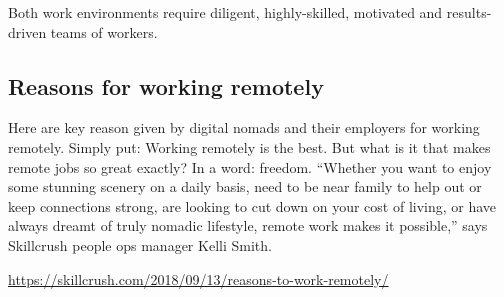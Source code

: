 \documentclass[]{book}
\begin{document}
Both work environments require diligent, highly-skilled, motivated and results-driven teams of workers.

\hypertarget{reasons-for-working-remotely}{%
\subsection{Reasons for working remotely}\label{reasons-for-working-remotely}}

Here are key reason given by digital nomads and their employers for working remotely. Simply put: Working remotely is the best. But what is it that makes remote jobs so great exactly? In a word: freedom. ``Whether you want to enjoy some stunning scenery on a daily basis, need to be near family to help out or keep connections strong, are looking to cut down on your cost of living, or have always dreamt of truly nomadic lifestyle, remote work makes it possible,'' says Skillcrush people ops manager Kelli Smith.

\url{https://skillcrush.com/2018/09/13/reasons-to-work-remotely/}
\end{document}

